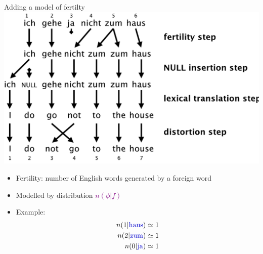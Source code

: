 \documentclass[landscape]{slides}
\newcommand{\example}[1]{\textcolor{darkblue}{\rm #1}}
\newcommand{\maths}[1]{\textcolor{purple}{#1}}
\begin{document}
\begin{center} 
Adding a model of fertilty\\[10mm]
\includegraphics[scale=1.0]{ich-gehe-ja-nicht-model3.pdf}
\end{center}


\vspace{10mm}
\begin{itemize}
\item Fertility: number of English words generated by a foreign word
\item Modelled by distribution \maths{$n(\phi|f)$}
\item Example:
\maths{\begin{equation*}
\begin{split}
n(1|\text{\example{haus}}) \simeq 1\\
n(2|\text{\example{zum}}) \simeq 1\\
n(0|\text{\example{ja}}) \simeq 1
\end{split}
\end{equation*}}
\end{itemize}

\end{document}
